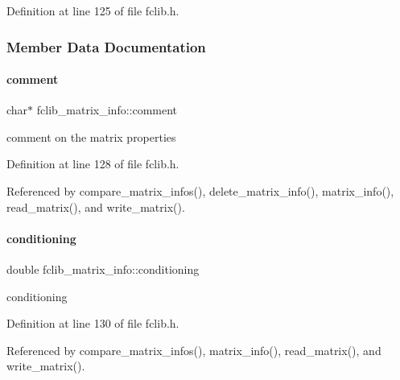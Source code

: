 Definition at line 125 of file fclib.\+h.



\subsubsection{Member Data Documentation}
\mbox{\label{structfclib__matrix__info_a9c4994b1759bf3a7a75c72cd78709722}} 
\paragraph{\texorpdfstring{comment}{comment}}
{\footnotesize\ttfamily char$\ast$ fclib\+\_\+matrix\+\_\+info\+::comment}



comment on the matrix properties 



Definition at line 128 of file fclib.\+h.



Referenced by compare\+\_\+matrix\+\_\+infos(), delete\+\_\+matrix\+\_\+info(), matrix\+\_\+info(), read\+\_\+matrix(), and write\+\_\+matrix().

\mbox{\label{structfclib__matrix__info_a453db794429411025f2b8dfb497f5f35}} 
\paragraph{\texorpdfstring{conditioning}{conditioning}}
{\footnotesize\ttfamily double fclib\+\_\+matrix\+\_\+info\+::conditioning}



conditioning 



Definition at line 130 of file fclib.\+h.



Referenced by compare\+\_\+matrix\+\_\+infos(), matrix\+\_\+info(), read\+\_\+matrix(), and write\+\_\+matrix().

\mbox{\label{structfclib__matrix__info_a9c6697aee458be4494b215f0f003ca48}} 
